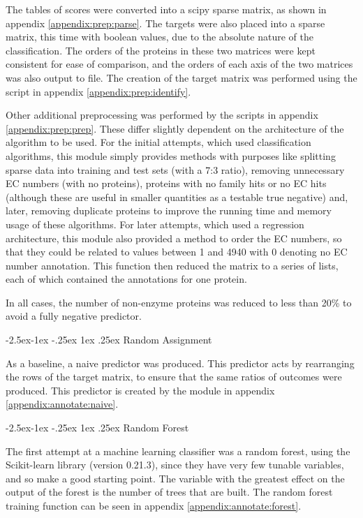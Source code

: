 \documentclass[12pt]{article}
\makeatletter
\renewcommand\subsection{\@startsection{subsection}{4}{\z@}
            {-2.5ex\@plus -1ex \@minus -.25ex}
            {1ex \@plus .25ex}
            {\normalfont\Large\bfseries}}
\makeatother
\begin{document}
		The tables of scores were converted into a scipy \citep{RefWorks:doc:5dd556c9e4b029f578deb63c} sparse matrix, as shown in appendix \ref{appendix:prep:parse}.  The targets were also placed into a sparse matrix, this time with boolean values, due to the absolute nature of the classification.  The orders of the proteins in these two matrices were kept consistent for ease of comparison, and the orders of each axis of the two matrices was also output to file.  The creation of the target matrix was performed using the script in appendix \ref{appendix:prep:identify}.  
		
		Other additional preprocessing was performed by the scripts in appendix \ref{appendix:prep:prep}.  These differ slightly dependent on the architecture of the algorithm to be used.  For the initial attempts, which used classification algorithms, this module simply provides methods with purposes like splitting sparse data into training and test sets (with a 7:3 ratio), removing unnecessary EC numbers (with no proteins), proteins with no family hits or no EC hits (although these are useful in smaller quantities as a testable true negative) and, later, removing duplicate proteins to improve the running time and memory usage of these algorithms.  For later attempts, which used a regression architecture, this module also provided a method to order the EC numbers, so that they could be related to values between 1 and 4940 with 0 denoting no EC number annotation.  This function then reduced the matrix to a series of lists, each of which contained the annotations for one protein. 
		
		In all cases, the number of non-enzyme proteins was reduced to less than 20\% to avoid a fully negative predictor. 
		
		\subsection{Random Assignment}
		
		As a baseline, a naive predictor was produced.  This predictor acts by rearranging the rows of the target matrix, to ensure that the same ratios of outcomes were produced.  This predictor is created by the module in appendix \ref{appendix:annotate:naive}.
		
		\subsection{Random Forest}
			
			The first attempt at a machine learning classifier was a random forest, using the Scikit-learn \citep{RefWorks:doc:5d80f150e4b07f40b9eab2f8} library (version 0.21.3), since they have very few tunable variables, and so make a good starting point.  The variable with the greatest effect on the output of the forest is the number of trees that are built.  The random forest training function can be seen in appendix \ref{appendix:annotate:forest}.
		
\end{document}
